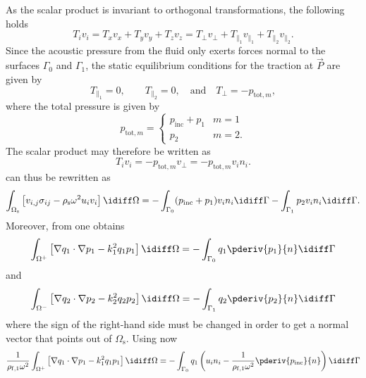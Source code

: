 As the scalar product is invariant to orthogonal transformations, the following holds
\begin{equation*}
	T_i v_i = T_x v_x + T_y v_y + T_z v_z = T_{\perp} v_{\perp} + T_{\|_1} v_{\|_1} + T_{\|_2} v_{\|_2}.
\end{equation*}
Since the acoustic pressure from the fluid only exerts forces normal to the surfaces $\Gamma_0$ and $\Gamma_1$, the static equilibrium conditions for the traction at $\vec{P}$ are given by
\begin{equation*}
	T_{\|_1}=0,\qquad T_{\|_2}=0,\quad\text{and}\quad T_{\perp} = -p_{\mathrm{tot},m},
\end{equation*}
where the total pressure is given by
\begin{equation*}
	p_{\mathrm{tot},m}= \begin{cases} p_{\mathrm{inc}} + p_1 & m = 1\\
	p_2 & m = 2.\end{cases}
\end{equation*}
The scalar product may therefore be written as
\begin{equation*}
	T_i v_i = -p_{\mathrm{tot},m} v_{\perp} = -p_{\mathrm{tot},m} v_i n_i.
\end{equation*}
 can thus be rewritten as
\begin{equation}\label{Eq2:FSIeq1}
	\int_{\Omega_{\mathrm{s}}} \left[v_{i,j}\sigma_{ij} - \rho_{\mathrm{s}}\omega^2 u_i v_i\right]\idiff\Omega = -\int_{\Gamma_0} (p_{\mathrm{inc}} + p_1) v_i n_i\idiff\Gamma-\int_{\Gamma_1} p_2 v_i n_i\idiff\Gamma.
\end{equation}
Moreover, from  one obtains
\begin{equation*}
	\int_{\Omega^+} \left[\nabla q_1\cdot\nabla p_1 - k_1^2q_1p_1\right]\idiff\Omega = -\int_{\Gamma_0} q_1 \pderiv{p_1}{n}\idiff\Gamma
\end{equation*}
and
\begin{equation*}
	\int_{\Omega^-} \left[\nabla q_2\cdot\nabla p_2 - k_2^2q_2p_2\right]\idiff\Omega = -\int_{\Gamma_1} q_2 \pderiv{p_2}{n}\idiff\Gamma
\end{equation*}
where the sign of the right-hand side must be changed in order to get a normal vector that points out of $\Omega_{\mathrm{s}}$. Using now 
\begin{equation}\label{Eq2:FSIeq2}
	\frac{1}{\rho_{\mathrm{f},1} \omega^2}\int_{\Omega^+} \left[\nabla q_1\cdot\nabla p_1 -  k_1^2 q_1p_1\right]\idiff\Omega = -\int_{\Gamma_0} q_1\left(u_i n_i -\frac{1}{\rho_{\mathrm{f},1} \omega^2}\pderiv{p_{\mathrm{inc}}}{n}\right)\idiff\Gamma
\end{equation}
